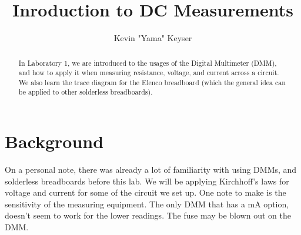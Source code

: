 \documentclass[%
 aip,
 jmp,
 amsmath,
 amssymb,
 reprint,%
 numerical,
 longbibliography,
]{revtex4-1}
\begin{document}

\title[Laboratory 1]{Inroduction to DC Measurements} %

\author{Kevin "Yama" Keyser}
%


\begin{abstract}
In Laboratory 1, we are introduced to the usages of the Digital Multimeter (DMM), and how
to apply it when measuring resistance, voltage, and current across a circuit.
We also learn the trace diagram for the Elenco breadboard (which the general idea
can be applied to other solderless breadboards).
\end{abstract}

\maketitle

%

\section{Background}

On a personal note, there was already a lot of familiarity with using DMMs, and solderless
breadboards before this lab. We will be applying Kirchhoff's laws for voltage and current
for some of the circuit we set up. One note to make is the sensitivity of the measuring
equipment. The only DMM that has a mA option, doesn't seem to work for the lower readings.
The fuse may be blown out on the DMM.
\end{document}
